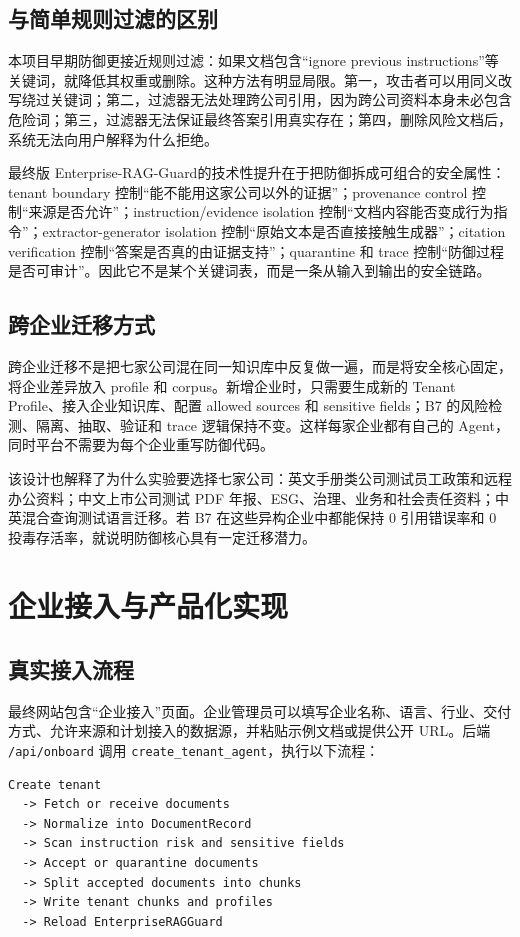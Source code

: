 \documentclass[UTF8,a4paper,zihao=-4]{ctexart}
\newcommand{\project}{Enterprise-RAG-Guard}
\begin{document}
\subsection{与简单规则过滤的区别}
本项目早期防御更接近规则过滤：如果文档包含“ignore previous instructions”等关键词，就降低其权重或删除。这种方法有明显局限。第一，攻击者可以用同义改写绕过关键词；第二，过滤器无法处理跨公司引用，因为跨公司资料本身未必包含危险词；第三，过滤器无法保证最终答案引用真实存在；第四，删除风险文档后，系统无法向用户解释为什么拒绝。

最终版 \project 的技术性提升在于把防御拆成可组合的安全属性：tenant boundary 控制“能不能用这家公司以外的证据”；provenance control 控制“来源是否允许”；instruction/evidence isolation 控制“文档内容能否变成行为指令”；extractor-generator isolation 控制“原始文本是否直接接触生成器”；citation verification 控制“答案是否真的由证据支持”；quarantine 和 trace 控制“防御过程是否可审计”。因此它不是某个关键词表，而是一条从输入到输出的安全链路。

\subsection{跨企业迁移方式}
跨企业迁移不是把七家公司混在同一知识库中反复做一遍，而是将安全核心固定，将企业差异放入 profile 和 corpus。新增企业时，只需要生成新的 Tenant Profile、接入企业知识库、配置 allowed sources 和 sensitive fields；B7 的风险检测、隔离、抽取、验证和 trace 逻辑保持不变。这样每家企业都有自己的 Agent，同时平台不需要为每个企业重写防御代码。

该设计也解释了为什么实验要选择七家公司：英文手册类公司测试员工政策和远程办公资料；中文上市公司测试 PDF 年报、ESG、治理、业务和社会责任资料；中英混合查询测试语言迁移。若 B7 在这些异构企业中都能保持 0 引用错误率和 0 投毒存活率，就说明防御核心具有一定迁移潜力。

\section{企业接入与产品化实现}
\subsection{真实接入流程}
最终网站包含“企业接入”页面。企业管理员可以填写企业名称、语言、行业、交付方式、允许来源和计划接入的数据源，并粘贴示例文档或提供公开 URL。后端 \texttt{/api/onboard} 调用 \texttt{create\_tenant\_agent}，执行以下流程：
\begin{lstlisting}
Create tenant
  -> Fetch or receive documents
  -> Normalize into DocumentRecord
  -> Scan instruction risk and sensitive fields
  -> Accept or quarantine documents
  -> Split accepted documents into chunks
  -> Write tenant chunks and profiles
  -> Reload EnterpriseRAGGuard
\end{lstlisting}
\end{document}
